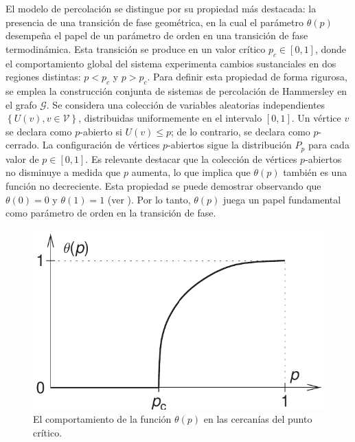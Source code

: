 El modelo de percolación se distingue por su propiedad más destacada: la presencia de una transición de fase geométrica, en la cual el parámetro $\theta(p)$ desempeña el papel de un parámetro de orden en una transición de fase termodinámica. Esta transición se produce en un valor crítico $p_c \in  [0 , 1]$, donde el comportamiento global del sistema experimenta cambios sustanciales en dos regiones distintas: $p < p_c$ y $p > p_c$.  Para definir esta propiedad de forma rigurosa, se emplea la construcción conjunta de sistemas de percolación de Hammersley \cite{broadbent_percolation_1957}  en el grafo $\mathcal{G}$. Se considera una colección de variables aleatorias independientes $\left\{U(v),v\in\mathcal{V}\right\}$, distribuidas uniformemente en el intervalo $[0,1]$. Un vértice $v$ se declara como $p$-abierto si $U(v) \leq p$; de lo contrario, se declara como $p$-cerrado. La configuración de vértices $p$-abiertos sigue la distribución $P_p$ para cada valor de $p\in [0, 1]$. Es relevante destacar que la colección de vértices $p$-abiertos no disminuye a medida que $p$ aumenta, lo que implica que $\theta(p)$ también es una función no decreciente. Esta propiedad se puede demostrar observando que $\theta(0) = 0$ y $\theta(1) = 1$  (ver ). Por lo tanto, $\theta(p)$  juega un papel fundamental como parámetro de orden en la transición de fase.



\begin{figure}[ht]
	\centering\includegraphics[width=\imsize]{probabilidadtheta.png}
	\caption[El comportamiento de la función $\theta(p)$ en las cercanías del punto crítico.]{El comportamiento de la función $\theta(p)$ en las cercanías del punto crítico.}\label{fig:probabilidadtheta}
\end{figure}


